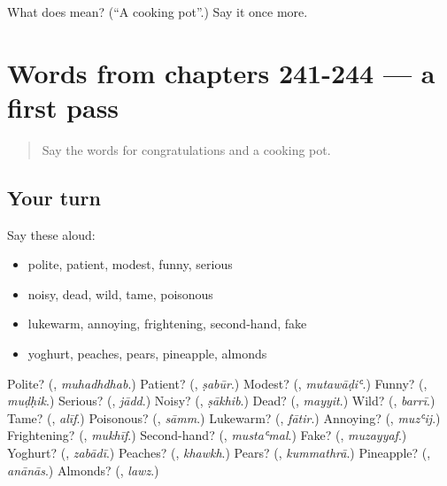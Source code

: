\begin{tcolorbox}[breakable,colback=teal!4,colframe=teal!35!black,title={Before you move on}]
What does  mean? (\textquotedblleft{}A cooking pot\textquotedblright{}.) Say it once more.
\end{tcolorbox}
\section[(dialogue)]{Words from chapters 241-244 — a first pass}

\label{lesson:AR-R249-first-pass-words-from-chapters-241-244}



\begin{quote}
Say the words for congratulations and a cooking pot.
\end{quote}

\subsection*{Your turn}
Say these aloud:

\begin{itemize}
\raggedright
  \item polite, patient, modest, funny, serious
  \item noisy, dead, wild, tame, poisonous
  \item lukewarm, annoying, frightening, second-hand, fake
  \item yoghurt, peaches, pears, pineapple, almonds
\end{itemize}

\begin{tcolorbox}[breakable,colback=teal!4,colframe=teal!35!black,title={Before you move on}]
Polite? (\textbf{}, \emph{muhadhdhab}.) Patient? (\textbf{}, \emph{ṣabūr}.) Modest? (\textbf{}, \emph{mutawāḍiʿ}.) Funny? (\textbf{}, \emph{muḍḥik}.) Serious? (\textbf{}, \emph{jādd}.) Noisy? (\textbf{}, \emph{ṣākhib}.) Dead? (\textbf{}, \emph{mayyit}.) Wild? (\textbf{}, \emph{barrī}.) Tame? (\textbf{}, \emph{alīf}.) Poisonous? (\textbf{}, \emph{sāmm}.) Lukewarm? (\textbf{}, \emph{fātir}.) Annoying? (\textbf{}, \emph{muzʿij}.) Frightening? (\textbf{}, \emph{mukhīf}.) Second-hand? (\textbf{}, \emph{mustaʿmal}.) Fake? (\textbf{}, \emph{muzayyaf}.) Yoghurt? (\textbf{}, \emph{zabādī}.) Peaches? (\textbf{}, \emph{khawkh}.) Pears? (\textbf{}, \emph{kummathrā}.) Pineapple? (\textbf{}, \emph{anānās}.) Almonds? (\textbf{}, \emph{lawz}.)
\end{tcolorbox}
